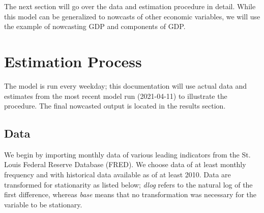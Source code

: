 \documentclass[11pt, letterpaper]{article}\usepackage[]{graphicx}\usepackage[]{color}
\begin{document}
The next section will go over the data and estimation procedure in detail. While this model can be generalized to nowcasts of other economic variables, we will use the example of nowcasting GDP and components of GDP.

\newpage
\section{Estimation Process}
The model is run every weekday; this documentation will use actual data and estimates from the most recent model run (2021-04-11) to illustrate the procedure. The final nowcasted output is located in the results section.

\subsection{Data}
We begin by importing monthly data of various leading indicators from the St. Louis Federal Reserve Database (FRED). We choose data of at least monthly frequency and with historical data available as of at least 2010. Data are transformed for stationarity as listed below; \textit{dlog} refers to the natural log of the first difference, whereas \textit{base} means that no transformation was necessary for the variable to be stationary.
\end{document}

